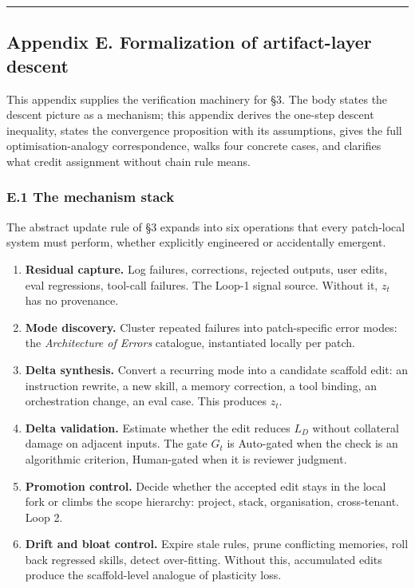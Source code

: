 \begin{center}\rule{0.5\linewidth}{0.5pt}\end{center}

\subsection{Appendix E. Formalization of artifact-layer
descent}\label{appendix-e.-formalization-of-artifact-layer-descent}

This appendix supplies the verification machinery for §3. The body
states the descent picture as a mechanism; this appendix derives the
one-step descent inequality, states the convergence proposition with its
assumptions, gives the full optimisation-analogy correspondence, walks
four concrete cases, and clarifies what credit assignment without chain
rule means.

\subsubsection{E.1 The mechanism stack}\label{e.1-the-mechanism-stack}

The abstract update rule of §3 expands into six operations that every
patch-local system must perform, whether explicitly engineered or
accidentally emergent.

\begin{enumerate}
\def\labelenumi{\arabic{enumi}.}
\tightlist
\item
  \textbf{Residual capture.} Log failures, corrections, rejected
  outputs, user edits, eval regressions, tool-call failures. The Loop-1
  signal source. Without it, \(z_t\) has no provenance.
\item
  \textbf{Mode discovery.} Cluster repeated failures into patch-specific
  error modes: the \emph{Architecture of Errors} catalogue, instantiated
  locally per patch.
\item
  \textbf{Delta synthesis.} Convert a recurring mode into a candidate
  scaffold edit: an instruction rewrite, a new skill, a memory
  correction, a tool binding, an orchestration change, an eval case.
  This produces \(z_t\).
\item
  \textbf{Delta validation.} Estimate whether the edit reduces \(L_D\)
  without collateral damage on adjacent inputs. The gate \(G_t\) is
  Auto-gated when the check is an algorithmic criterion, Human-gated
  when it is reviewer judgment.
\item
  \textbf{Promotion control.} Decide whether the accepted edit stays in
  the local fork or climbs the scope hierarchy: project, stack,
  organisation, cross-tenant. Loop 2.
\item
  \textbf{Drift and bloat control.} Expire stale rules, prune
  conflicting memories, roll back regressed skills, detect over-fitting.
  Without this, accumulated edits produce the scaffold-level analogue of
  plasticity loss.
\end{enumerate}


